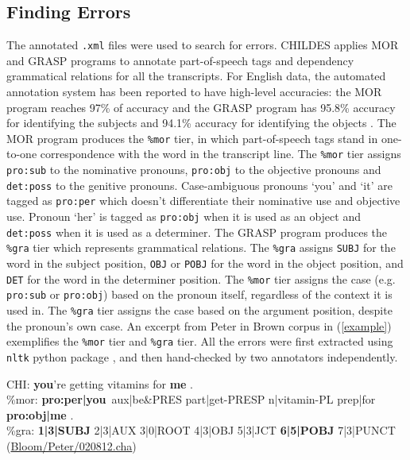 \subsection{Finding Errors}
The annotated \texttt{.xml} files were used to search for errors. CHILDES applies MOR and GRASP programs to annotate part-of-speech tags and dependency grammatical relations for all the transcripts. For English data, the automated annotation system has been reported to have high-level accuracies: the MOR program reaches 97\% of accuracy and the GRASP program has 95.8\% accuracy for identifying the subjects and 94.1\% accuracy for identifying the objects \citep{macwhinney2012morphosyntactic,sagae2010morphosyntactic}. The MOR program produces the \texttt{\%mor} tier, in which part-of-speech tags stand in one-to-one correspondence with the word in the transcript line. The \texttt{\%mor} tier assigns \texttt{pro:sub} to the nominative pronouns, \texttt{pro:obj} to the objective pronouns and \texttt{det:poss} to the genitive pronouns. Case-ambiguous pronouns `you' and `it' are tagged as \texttt{pro:per} which doesn't differentiate their nominative use and objective use. Pronoun `her' is tagged as \texttt{pro:obj} when it is used as an object and \texttt{det:poss} when it is used as a determiner. The GRASP program produces the \texttt{\%gra} tier which represents grammatical relations. The \texttt{\%gra} assigns \texttt{SUBJ} for the word in the subject position,  \texttt{OBJ} or \texttt{POBJ} for the word in the object position, and \texttt{DET} for the word in the determiner position. The \texttt{\%mor} tier assigns the case (e.g. \texttt{pro:sub} or \texttt{pro:obj}) based on the pronoun itself, regardless of the context it is used in. The \texttt{\%gra} tier assigns the case based on the argument position, despite the pronoun's own case. An excerpt from Peter in Brown corpus in (\ref{example}) exemplifies the \texttt{\%mor} tier and \texttt{\%gra} tier. All the errors were first extracted using \texttt{nltk} python package \citep{bird2009natural}, and then hand-checked by two annotators independently. 
\begin{exe}
\ex \label{example} \gll *CHI: \textbf{you}'re getting vitamins for \textbf{me }.\\
\%mor:	\textbf{pro:per|you}~aux|be&PRES part|get-PRESP n|vitamin-PL prep|for \textbf{pro:obj|me} .\\
\%gra:\textbf{	1|3|SUBJ} 2|3|AUX 3|0|ROOT 4|3|OBJ 5|3|JCT \textbf{6|5|POBJ} 7|3|PUNCT\\
(\href{https://childes.talkbank.org/browser/index.php?url=Eng-NA/Bloom/Peter/020812.cha}{Bloom/Peter/020812.cha})
\end{exe}

